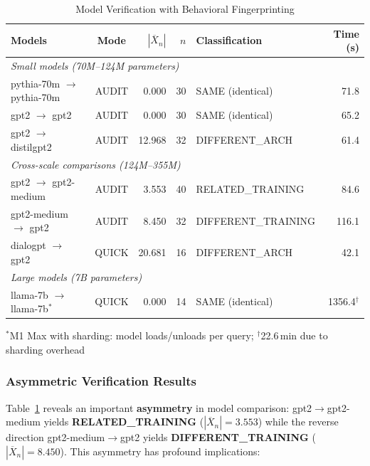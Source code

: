 \documentclass[11pt]{article}
\begin{document}
\begin{table}[ht!]
\centering
\caption{Model Verification with Behavioral Fingerprinting}
\label{tab:decisions}
\small
\begin{tabular}{@{}l c r r l r@{}}
\toprule
\textbf{Models} & \textbf{Mode} & \textbf{$|\overline{X}_n|$} & \textbf{$n$} & \textbf{Classification} & \textbf{Time (s)} \\
\midrule
\multicolumn{6}{l}{\emph{Small models (70M--124M parameters)}} \\
pythia-70m $\to$ pythia-70m & AUDIT & 0.000 & 30 & SAME (identical) & 71.8 \\
gpt2 $\to$ gpt2 & AUDIT & 0.000 & 30 & SAME (identical) & 65.2 \\
gpt2 $\to$ distilgpt2 & AUDIT & 12.968 & 32 & DIFFERENT\_ARCH & 61.4 \\
\midrule
\multicolumn{6}{l}{\emph{Cross-scale comparisons (124M--355M)}} \\
gpt2 $\to$ gpt2-medium & AUDIT & 3.553 & 40 & RELATED\_TRAINING & 84.6 \\
gpt2-medium $\to$ gpt2 & AUDIT & 8.450 & 32 & DIFFERENT\_TRAINING & 116.1 \\
dialogpt $\to$ gpt2 & QUICK & 20.681 & 16 & DIFFERENT\_ARCH & 42.1 \\
\midrule
\multicolumn{6}{l}{\emph{Large models (7B parameters)}} \\
llama-7b $\to$ llama-7b$^*$ & QUICK & 0.000 & 14 & SAME (identical) & 1356.4$^{\dagger}$ \\
\bottomrule
\end{tabular}

\vspace{3pt}
\footnotesize{$^*$M1 Max with sharding: model loads/unloads per query; $^{\dagger}$22.6\,min due to sharding overhead}
\end{table}

\subsubsection{Asymmetric Verification Results}

Table~\ref{tab:decisions} reveals an important \textbf{asymmetry} in model comparison: gpt2$\to$gpt2-medium yields \textbf{RELATED\_TRAINING} ($|\overline{X}_n|=3.553$) while the reverse direction gpt2-medium$\to$gpt2 yields \textbf{DIFFERENT\_TRAINING} ($|\overline{X}_n|=8.450$). This asymmetry has profound implications:
\end{document}
